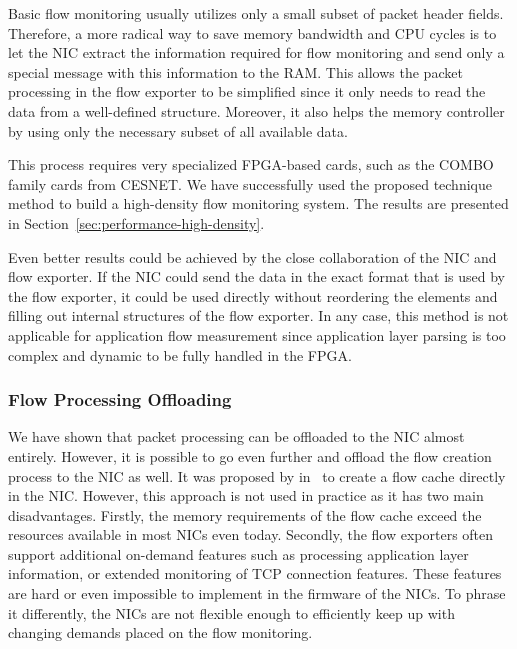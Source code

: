 Basic flow monitoring usually utilizes only a small subset of packet header fields. Therefore, a more radical way to save memory bandwidth and CPU cycles is to let the NIC extract the information required for flow monitoring and send only a special message with this information to the RAM. This allows the packet processing in the flow exporter to be simplified since it only needs to read the data from a well-defined structure. Moreover, it also helps the memory controller by using only the necessary subset of all available data.

This process requires very specialized FPGA-based cards, such as the COMBO family cards from CESNET. We have successfully used the proposed technique method to build a high-density flow monitoring system. The results are presented in Section~\ref{sec:performance-high-density}.

Even better results could be achieved by the close collaboration of the NIC and flow exporter. If the NIC could send the data in the exact format that is used by the flow exporter, it could be used directly without reordering the elements and filling out internal structures of the flow exporter. In any case, this method is not applicable for application flow measurement since application layer parsing is too complex and dynamic to be fully handled in the FPGA.

\subsubsection{Flow Processing Offloading}
We have shown that packet processing can be offloaded to the NIC almost entirely. However, it is possible to go even further and offload the flow creation process to the NIC as well. It was proposed by \citeauthor{Zadnik-2008-Network} in~\cite{Zadnik-2008-Network} to create a flow cache directly in the NIC. However, this approach is not used in practice as it has two main disadvantages. Firstly, the memory requirements of the flow cache exceed the resources available in most NICs even today. Secondly, the flow exporters often support additional on-demand features such as processing application layer information, or extended monitoring of TCP connection features. These features are hard or even impossible to implement in the firmware of the NICs. To phrase it differently, the NICs are not flexible enough to efficiently keep up with changing demands placed on the flow monitoring.


